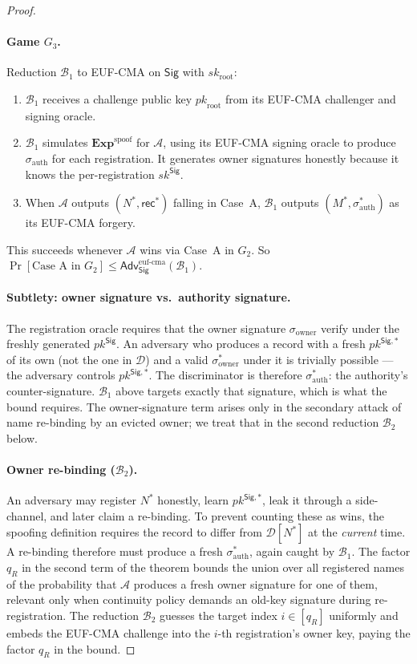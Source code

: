 \documentclass[11pt,a4paper]{article}
\theoremstyle{definition}
\theoremstyle{remark}
\newcommand{\rec}{\mathsf{rec}}
\newcommand{\Sig}{\mathsf{Sig}}
\newcommand{\Adv}{\mathsf{Adv}}
\newcommand{\pk}{\mathit{pk}}
\newcommand{\sk}{\mathit{sk}}
\begin{document}
\begin{proof}
\paragraph{Game $G_3$.} Reduction $\mathcal{B}_1$ to EUF-CMA on
$\Sig$ with $\sk_{\mathrm{root}}$:
\begin{enumerate}[leftmargin=*]
\item $\mathcal{B}_1$ receives a challenge public key $\pk_{\mathrm{root}}$
from its EUF-CMA challenger and signing oracle.
\item $\mathcal{B}_1$ simulates $\mathbf{Exp}^{\mathrm{spoof}}$ for
$\mathcal{A}$, using its EUF-CMA signing oracle to produce
$\sigma_{\mathrm{auth}}$ for each registration. It generates owner
signatures honestly because it knows the per-registration $\sk^\Sig$.
\item When $\mathcal{A}$ outputs $(N^*, \rec^*)$ falling in Case~A,
$\mathcal{B}_1$ outputs $(M^*, \sigma^*_{\mathrm{auth}})$ as its
EUF-CMA forgery.
\end{enumerate}
This succeeds whenever $\mathcal{A}$ wins via Case~A in $G_2$. So
$\Pr[\text{Case A in } G_2] \le \Adv^{\mathrm{euf\text{-}cma}}_{\Sig}(\mathcal{B}_1)$.

\paragraph{Subtlety: owner signature vs.\ authority signature.} The
registration oracle requires that the owner signature
$\sigma_{\mathrm{owner}}$ verify under the freshly generated
$\pk^\Sig$. An adversary who produces a record with a fresh
$\pk^{\Sig,*}$ of its own (not the one in $\mathcal{D}$) and a valid
$\sigma^*_{\mathrm{owner}}$ under it is trivially possible --- the
adversary controls $\pk^{\Sig,*}$. The discriminator is therefore
$\sigma^*_{\mathrm{auth}}$: the authority's counter-signature.
$\mathcal{B}_1$ above targets exactly that signature, which is what
the bound requires. The owner-signature term arises only in the
secondary attack of name re-binding by an evicted owner; we treat that
in the second reduction $\mathcal{B}_2$ below.

\paragraph{Owner re-binding ($\mathcal{B}_2$).} An adversary may
register $N^*$ honestly, learn $\pk^{\Sig,*}$, leak it through a
side-channel, and later claim a re-binding. To prevent counting these
as wins, the spoofing definition requires the record to differ from
$\mathcal{D}[N^*]$ at the \emph{current} time. A re-binding therefore
must produce a fresh $\sigma^*_{\mathrm{auth}}$, again caught by
$\mathcal{B}_1$. The factor $q_R$ in the second term of the theorem
bounds the union over all registered names of the probability that
$\mathcal{A}$ produces a fresh owner signature for one of them,
relevant only when continuity policy demands an old-key signature
during re-registration. The reduction $\mathcal{B}_2$ guesses the
target index $i \in [q_R]$ uniformly and embeds the EUF-CMA challenge
into the $i$-th registration's owner key, paying the factor $q_R$ in
the bound.


\end{proof}
\end{document}
